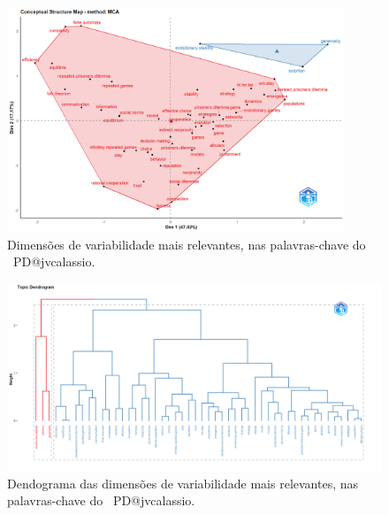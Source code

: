 \begin{figure}
    \centering
    \includegraphics[width=0.9\textwidth]{exploratory-data-analysis/jvcalassio/PesqBibliogr/PrisonersDilemma/WoS-20221201/Dataset/FactorialMap-2022-12-03.png}
    \caption{Dimensões de variabilidade mais relevantes, nas palavras-chave do  \dataset\ PD@jvcalassio.}
    \label{fig:PD@jvcalassio:FactorialAnalysis-MCA-FactorialMap}
\end{figure}

\begin{figure}
    \centering
    \includegraphics[width=1\textwidth]{exploratory-data-analysis/jvcalassio/PesqBibliogr/PrisonersDilemma/WoS-20221201/Dataset/Dendrogram-2022-12-03.png}
    \caption{Dendograma das dimensões de variabilidade mais relevantes, nas palavras-chave do  \dataset\ PD@jvcalassio.}
    \label{fig:PD@jvcalassio:FactorialAnalysis-MCA-Dendrogram}
\end{figure}


